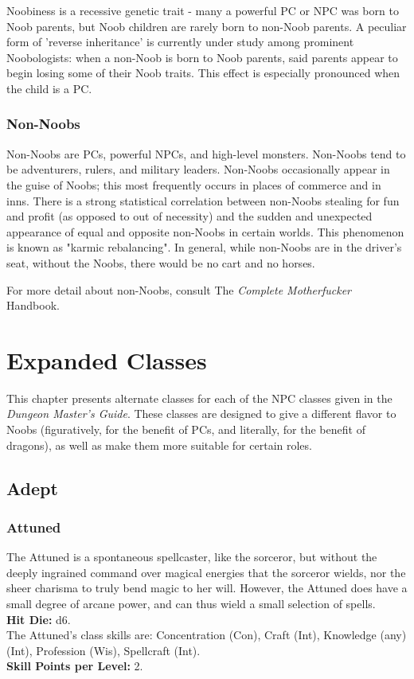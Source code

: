 \documentclass[11pt]{report}
\begin{document}
Noobiness is a recessive genetic trait - many a powerful PC or NPC was born to
Noob parents, but Noob children are rarely born to non-Noob parents. A peculiar
form of 'reverse inheritance' is currently under study among prominent
Noobologists: when a non-Noob is born to Noob parents, said parents appear to
begin losing some of their Noob traits. This effect is especially pronounced
when the child is a PC.

\subsection{Non-Noobs}
Non-Noobs are PCs, powerful NPCs, and high-level monsters. Non-Noobs tend to be
adventurers, rulers, and military leaders. Non-Noobs occasionally appear in the
guise of Noobs; this most frequently occurs in places of commerce and in inns.
There is a strong statistical correlation between non-Noobs stealing for fun and
profit (as opposed to out of necessity) and the sudden and unexpected appearance
of equal and opposite non-Noobs in certain worlds. This phenomenon is known as
"karmic rebalancing". In general, while non-Noobs are in the driver's seat,
without the Noobs, there would be no cart and no horses.

For more detail about non-Noobs, consult The \textit{Complete Motherfucker}
Handbook.

\chapter{Expanded Classes}
This chapter presents alternate classes for each of the NPC classes given in the
\textit{Dungeon Master's Guide}. These classes are designed to give a different
flavor to Noobs (figuratively, for the benefit of PCs, and literally, for the
benefit of dragons), as well as make them more suitable for certain roles.

\section{Adept}
\subsection{Attuned}
The Attuned is a spontaneous spellcaster, like the sorceror, but without the
deeply ingrained command over magical energies that the sorceror wields, nor the
sheer charisma to truly bend magic to her will. However, the Attuned does have
a small degree of arcane power, and can thus wield a small selection of spells.
\\
\textbf{Hit Die:} d6. \\
The Attuned's class skills are: Concentration (Con), Craft (Int), Knowledge
(any) (Int), Profession (Wis), Spellcraft (Int). \\
\textbf{Skill Points per Level:} 2.
\end{document}
